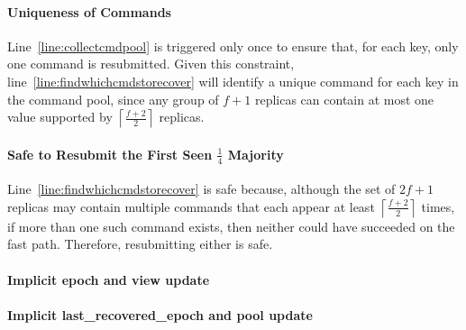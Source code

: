 \documentclass[twocolumn]{article}
\begin{document}
\paragraph{Uniqueness of Commands}  
Line~\ref{line:collectcmdpool} is triggered only once to ensure that, for each key, only one command is resubmitted. Given this constraint, line~\ref{line:findwhichcmdstorecover} will identify a unique command for each key in the command pool, since any group of $f+1$ replicas can contain at most one value supported by $\left\lceil\frac{f+2}{2}\right\rceil$ replicas.


\paragraph{Safe to Resubmit the First Seen \texorpdfstring{$\frac{1}{4}$}{1/4} Majority}  
Line~\ref{line:findwhichcmdstorecover} is safe because, although the set of $2f+1$ replicas may contain multiple commands that each appear at least $\left\lceil\frac{f+2}{2}\right\rceil$ times, if more than one such command exists, then neither could have succeeded on the fast path. Therefore, resubmitting either is safe.

\paragraph{Implicit epoch and view update}

\paragraph{Implicit last\_recovered\_epoch and pool update}
\end{document}
